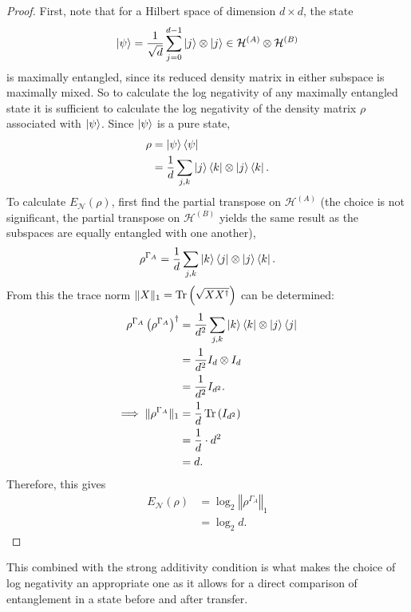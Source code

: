 \begin{proof}
    First, note that for a Hilbert space of dimension $d\times d$, the state
    \begin{equation}
        \ket{\psi} = \frac{1}{\sqrt{d}}\sum_{j=0}^{d-1}\ket{j}\otimes\ket{j}\in \mathcal{H}^{(A)} \otimes \mathcal{H}^{(B)}
    \end{equation}
    is maximally entangled, since its reduced density matrix in either subspace is maximally mixed.
    So to calculate the log negativity of any maximally entangled state it is sufficient to calculate the log negativity of the density matrix $\rho$ associated with $\ket{\psi}$.
    Since $\ket{\psi}$ is a pure state,
    \begin{align}
        \rho &= \ket{\psi}\bra{\psi}\\
        &=\frac{1}{d} \sum_{j,k}\ket{j}\bra{k}\otimes\ket{j}\bra{k}.
    \end{align}
    To calculate $E_{\mathcal{N}}(\rho)$, first find the partial transpose on $\mathcal{H}^{(A)}$ (the choice is not significant, the partial transpose on $\mathcal{H}^{(B)}$ yields the same result as the subspaces are equally entangled with one another),
    \begin{align}
        \rho^{\Gamma_A} =\frac{1}{d} \sum_{j,k}\ket{k}\bra{j}\otimes\ket{j}\bra{k}.
    \end{align}
    From this the trace norm $\Vert X\Vert_1 = \operatorname{Tr}\left(\sqrt{XX^{\dagger}}\right)$ can be determined:
    \begin{align}
        \rho^{\Gamma_A}\left(\rho^{\Gamma_A}\right)^{\dagger} &= \frac{1}{d^2} \sum_{j,k}\ket{k}\bra{k}\otimes\ket{j}\bra{j}\\
        &=\frac{1}{d^2}I_d\otimes I_d\\
        &=\frac{1}{d^2}I_{d^2}.\\
        \implies \Vert\rho^{\Gamma_A}\Vert_1 &= \frac{1}{d}\operatorname{Tr}{\left(I_{d^2}\right)}\\
        &= \frac{1}{d}\cdot d^2\\
        &= d.
    \end{align}
    Therefore, this gives
    \begin{align}
        E_{\mathcal{N}}(\rho) &= \log_2\left\Vert \rho^{\Gamma_A}\right\Vert_1\\
        &= \log_2d.
    \end{align}
\end{proof}
This combined with the strong additivity condition is what makes the choice of log negativity an appropriate one as it allows for a direct comparison of entanglement in a state before and after transfer.
